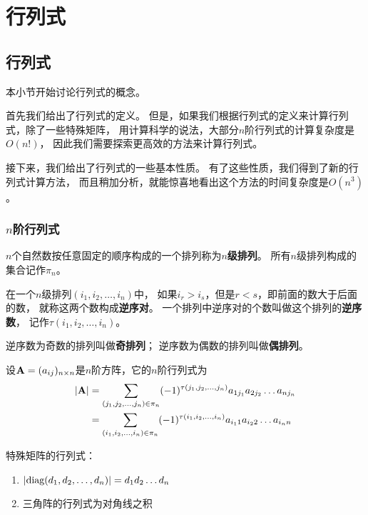 \chapter{行列式}

\section{行列式}
本小节开始讨论行列式的概念。

首先我们给出了行列式的定义。
但是，如果我们根据行列式的定义来计算行列式，除了一些特殊矩阵，
用计算科学的说法，大部分$n$阶行列式的计算复杂度是$O(n!)$，
因此我们需要探索更高效的方法来计算行列式。

接下来，我们给出了行列式的一些基本性质。
有了这些性质，我们得到了新的行列式计算方法，
而且稍加分析，就能惊喜地看出这个方法的时间复杂度是$O(n^3)$。

\subsection{$n$阶行列式}
\begin{definition}[$n$级排列]
  $n$个自然数按任意固定的顺序构成的一个排列称为$n$\textbf{级排列}。
  所有$n$级排列构成的集合记作$\pi_n$。
\end{definition}

\begin{definition}[逆序数]
  在一个$n$级排列$(i_1,i_2,\dots,i_n)$中，
  如果$i_r>i_s$，但是$r<s$，即前面的数大于后面的数，
  就称这两个数构成\textbf{逆序对}。
  一个排列中逆序对的个数叫做这个排列的\textbf{逆序数}，
  记作$\tau(i_1,i_2,\dots,i_n)$。
\end{definition}

\begin{definition}[奇、偶排列]
  逆序数为奇数的排列叫做\textbf{奇排列}；
  逆序数为偶数的排列叫做\textbf{偶排列}。
\end{definition}

\begin{definition}[$n$阶行列式]
  设$\mathbf{A}=(a_{ij})_{n\times n}$是$n$阶方阵，它的$n$阶行列式为
  \begin{align*}
    |\mathbf{A}| &= \sum_{(j_1,j_2,\dots,j_n)\in\pi_n}
    (-1)^{\tau(j_1,j_2,\dots,j_n)}a_{1j_1}a_{2j_2}\dots a_{nj_n} \\
    &= \sum_{(i_1,i_2,\dots,i_n)\in\pi_n}
    (-1)^{\tau(i_1,i_2,\dots,i_n)}a_{i_1 1}a_{i_2 2}\dots a_{i_n n}
  \end{align*}
\end{definition}

特殊矩阵的行列式：
\begin{enumerate}
  \item $|\textrm{diag}(d_1,d_2,\dots,d_n)| = d_1d_2\dots d_n$
  \item 三角阵的行列式为对角线之积
\end{enumerate}

